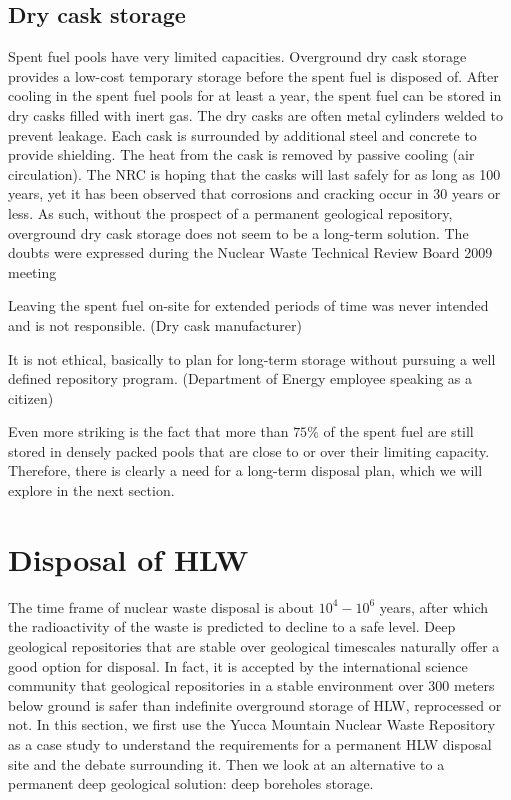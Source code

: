 \documentclass[nofootinbib,preprint,aps]{revtex4-1}
\begin{document}
    \subsection{Dry cask storage}
    Spent fuel pools have very limited capacities. 
    Overground dry cask storage provides a low-cost temporary storage before the spent fuel is disposed of.
    After cooling in the spent fuel pools for at least a year, the spent fuel can be stored in dry casks filled with inert gas. 
The dry casks are often metal cylinders welded to prevent leakage. Each cask is surrounded by
    additional steel and concrete to provide shielding.
    The heat from the cask is removed by passive
    cooling (air circulation). The NRC is hoping that the casks will
    last safely for as long as 100 years, yet it has been observed that corrosions and cracking occur in 30 years
    or less.\cite{aa12} As such, without the prospect of a permanent geological repository,
    overground dry cask storage does not seem to be a long-term solution. The doubts were expressed
    during the Nuclear Waste Technical Review Board 2009 meeting \cite{nwtb09, aa12}
    \begin{displayquote}
    Leaving the spent fuel on-site for extended periods of time was never intended and is not
    responsible. (Dry cask manufacturer)

    It is not ethical, basically to plan for long-term storage without pursuing a well defined repository
    program. (Department of Energy employee speaking as a citizen)
    \end{displayquote}
    Even more striking is the fact that more than $75\%$ of the spent fuel are still stored in densely
    packed pools
    that are close to or over their limiting capacity.\cite{a11,aa12}
    Therefore, there is clearly a need for a long-term disposal plan, which we will explore in
    the next section.

\section{Disposal of HLW}
\label{sec:disposal}
    The time frame of nuclear waste disposal is about $10^4-10^6$ years, after which the radioactivity
    of the waste is predicted to decline to a safe level.
    Deep geological repositories that are stable over geological timescales naturally offer a good option for disposal.
    In fact, it is accepted by the international science community that geological repositories in a stable environment over 300 meters below ground
    is safer than indefinite overground storage of HLW, reprocessed or not.\cite{fmr11}
    In this section, we first use the Yucca Mountain Nuclear Waste
    Repository as a case study to understand the requirements for a permanent HLW disposal site and the debate
    surrounding it.
    Then we look at an alternative to a permanent deep geological solution:
    deep boreholes storage.
\end{document}
